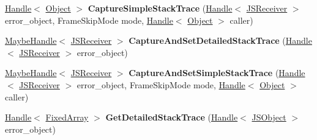 \begin{DoxyCompactItemize}
\item 
\mbox{\label{classv8_1_1internal_1_1Isolate_ad27aaa9b36a9b8dcfff367b20a7c65e0}} 
\mbox{\hyperlink{classv8_1_1internal_1_1Handle}{Handle}}$<$ \mbox{\hyperlink{classv8_1_1internal_1_1Object}{Object}} $>$ {\bfseries Capture\+Simple\+Stack\+Trace} (\mbox{\hyperlink{classv8_1_1internal_1_1Handle}{Handle}}$<$ \mbox{\hyperlink{classv8_1_1internal_1_1JSReceiver}{J\+S\+Receiver}} $>$ error\+\_\+object, Frame\+Skip\+Mode mode, \mbox{\hyperlink{classv8_1_1internal_1_1Handle}{Handle}}$<$ \mbox{\hyperlink{classv8_1_1internal_1_1Object}{Object}} $>$ caller)
\item 
\mbox{\label{classv8_1_1internal_1_1Isolate_a2c68a9eb9a1741a67f8cda3e40f781e5}} 
\mbox{\hyperlink{classv8_1_1internal_1_1MaybeHandle}{Maybe\+Handle}}$<$ \mbox{\hyperlink{classv8_1_1internal_1_1JSReceiver}{J\+S\+Receiver}} $>$ {\bfseries Capture\+And\+Set\+Detailed\+Stack\+Trace} (\mbox{\hyperlink{classv8_1_1internal_1_1Handle}{Handle}}$<$ \mbox{\hyperlink{classv8_1_1internal_1_1JSReceiver}{J\+S\+Receiver}} $>$ error\+\_\+object)
\item 
\mbox{\label{classv8_1_1internal_1_1Isolate_ad258c25d9734f83fc1b8590960394f3b}} 
\mbox{\hyperlink{classv8_1_1internal_1_1MaybeHandle}{Maybe\+Handle}}$<$ \mbox{\hyperlink{classv8_1_1internal_1_1JSReceiver}{J\+S\+Receiver}} $>$ {\bfseries Capture\+And\+Set\+Simple\+Stack\+Trace} (\mbox{\hyperlink{classv8_1_1internal_1_1Handle}{Handle}}$<$ \mbox{\hyperlink{classv8_1_1internal_1_1JSReceiver}{J\+S\+Receiver}} $>$ error\+\_\+object, Frame\+Skip\+Mode mode, \mbox{\hyperlink{classv8_1_1internal_1_1Handle}{Handle}}$<$ \mbox{\hyperlink{classv8_1_1internal_1_1Object}{Object}} $>$ caller)
\item 
\mbox{\label{classv8_1_1internal_1_1Isolate_a28779924cb790c302fac3e53457c7de7}} 
\mbox{\hyperlink{classv8_1_1internal_1_1Handle}{Handle}}$<$ \mbox{\hyperlink{classv8_1_1internal_1_1FixedArray}{Fixed\+Array}} $>$ {\bfseries Get\+Detailed\+Stack\+Trace} (\mbox{\hyperlink{classv8_1_1internal_1_1Handle}{Handle}}$<$ \mbox{\hyperlink{classv8_1_1internal_1_1JSObject}{J\+S\+Object}} $>$ error\+\_\+object)
\item 
\mbox{\label{classv8_1_1internal_1_1Isolate_a9f39ee306e75cfb50acd5fa2fbd6df0d}} 

\end{DoxyCompactItemize}
